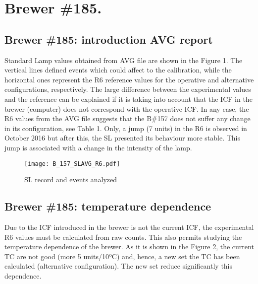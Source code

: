 \documentclass[../main.tex]{subfiles}
\begin{document}
 

\section{Brewer \#185.}


 \begin{sidewaystable}[h]

        {}
        {}
 
\end{sidewaystable}

\subsection{Brewer \#185: introduction AVG report}

Standard Lamp values obtained from AVG file are shown in the Figure 1. The vertical lines defined events which could affect to the calibration, while the horizontal ones represent the R6 reference values for the operative and alternative configurations, respectively. The large difference between the experimental values and the reference can be explained if it is taking into account that the ICF in the brewer (computer) does not correspond with the operative ICF. In any case, the R6 values from the AVG file suggests that the B\#157 does not suffer any change in its configuration, see Table 1. Only, a jump (7 units) in the R6 is observed in October 2016 but after this, the SL presented its behaviour more stable. This jump is associated with a change in the intensity of the lamp.
 
 \begin{sidewaysfigure}[h]
   \texttt{[image: B\_157\_SLAVG\_R6.pdf]}
   \label{fig:SL_events}
   \caption{SL record and events analyzed}
\end{sidewaysfigure}

 
 \begin{sidewaystable}[h]

 \end{sidewaystable}
 
\subsection{Brewer \#185: temperature dependence} 
Due to the ICF introduced in the brewer is not the current ICF, the experimental R6 values must be calculated from raw counts. This also permits studying the temperature dependence of the brewer. As it is shown in the Figure 2, the current TC are not good (more 5 units/10ºC) and, hence, a new set the TC has been calculated (alternative configuration).  The new set reduce significantly this dependence.
\end{document}

